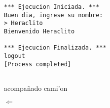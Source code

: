 \documentclass[12pt,twoside,titlepage]{book}
\newcounter{ejercicio}
\begin{document}
%


\begin{lstlisting}[style=consola, numbers=none, caption={vaca}]
*** Ejecucion Iniciada. *** 
Buen dia, ingrese su nombre: 
> Heraclito
Bienvenido Heraclito

*** Ejecucion Finalizada. ***
logout
[Process completed]


\end{lstlisting}

acompa\~nado cami'on

$\Longleftarrow$
\end{document}
